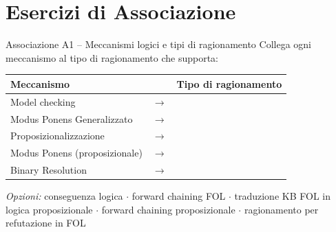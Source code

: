 \documentclass[12pt,a4paper]{article}
\begin{document}
\newpage

\section{Esercizi di Associazione}

\begin{assocbox}{Associazione A1 -- Meccanismi logici e tipi di ragionamento}
Collega ogni meccanismo al tipo di ragionamento che supporta:

\begin{center}
\renewcommand{\arraystretch}{1.5}
\begin{tabular}{lll}
\textbf{Meccanismo} & & \textbf{Tipo di ragionamento} \\
\hline
Model checking & $\longrightarrow$ & \underline{\hspace{5cm}} \\
Modus Ponens Generalizzato & $\longrightarrow$ & \underline{\hspace{5cm}} \\
Proposizionalizzazione & $\longrightarrow$ & \underline{\hspace{5cm}} \\
Modus Ponens (proposizionale) & $\longrightarrow$ & \underline{\hspace{5cm}} \\
Binary Resolution & $\longrightarrow$ & \underline{\hspace{5cm}} \\
\end{tabular}
\end{center}

\smallskip
\textit{Opzioni:} conseguenza logica $\cdot$ forward chaining FOL $\cdot$ traduzione KB FOL in logica proposizionale $\cdot$ forward chaining proposizionale $\cdot$ ragionamento per refutazione in FOL
\end{assocbox}
\end{document}
